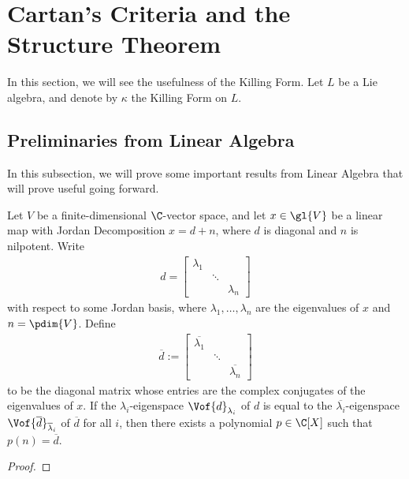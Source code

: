 \section{Cartan's Criteria and the Structure Theorem}

In this section, we will see the usefulness of the Killing Form. Let $L$ be a Lie algebra, and denote by $\kappa$ the Killing Form on $L$.

\subsection{Preliminaries from Linear Algebra}

In this subsection, we will prove some important results from Linear Algebra that will prove useful going forward.

\begin{lemma}\label{Ch2:Lemma:PolyConjDiag}
    Let $V$ be a finite-dimensional $\C$-vector space, and let $x \in \gl{V}$ be a linear map with Jordan Decomposition $x = d + n$, where $d$ is diagonal and $n$ is nilpotent. Write
    \begin{align*}
        d = \begin{bmatrix}
                \lambda_1 & & \\
                & \ddots & \\
                & & \lambda_n
            \end{bmatrix}
    \end{align*}
    with respect to some Jordan basis, where $\lambda_1, \ldots, \lambda_n$ are the eigenvalues of $x$ and $n = \pdim{V}$. Define
    \begin{align*}
        \overline{d} :=
        \begin{bmatrix}
            \overline{\lambda_1} & & \\
            & \ddots & \\
            & & \overline{\lambda_n}
        \end{bmatrix}
    \end{align*}
    to be the diagonal matrix whose entries are the complex conjugates of the eigenvalues of $x$. If the $\lambda_i$-eigenspace $\Vof{d}_{\lambda_i}$ of $d$ is equal to the $\overline{\lambda_i}$-eigenspace $\Vof{\overline{d}}_{\overline{\lambda}_i}$ of $\overline{d}$ for all $i$, then there exists a polynomial $p \in \C[X]$ such that $p(n) = \overline{d}$.
\end{lemma}
\begin{proof}
    
    \sorry
\end{proof}

